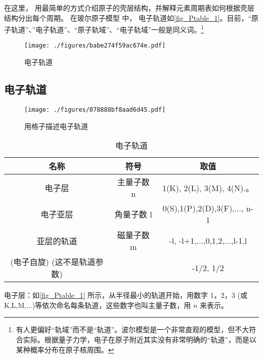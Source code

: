 
\begin{issues}
\issueTODO
\end{issues}

在这里， 用最简单的方式介绍原子的壳层结构，并解释元素周期表如何根据壳层结构分出每个周期。 在玻尔原子模型 中， 电子轨道如\autoref{fig_Ptable_1}。目前，“原子轨道”、”电子轨道”、“原子轨域”、“电子轨域”一般是同义词。\footnote{有人更偏好“轨域”而不是“轨道”。波尔模型是一个非常直观的模型，但不大符合实际。根据量子力学，电子在原子附近其实没有非常明确的“轨道”，而是以某种概率分布在原子核周围。}

\begin{figure}[ht]
\centering
\texttt{[image: ./figures/babe274f59ac674e.pdf]}
\caption{电子轨道}\label{fig_Ptable_1}
\end{figure}

\subsection{电子轨道}
\begin{figure}[ht]
\centering
\texttt{[image: ./figures/078888bf8aad6d45.pdf]}
\caption{用格子描述电子轨道}\label{fig_Ptable_4}
\end{figure}

\begin{table}[ht]
\centering
\caption{电子轨道}\label{tab_Ptable_1}
\begin{tabular}{|c|c|c|}
\hline
名称&符号&取值\\
\hline
电子层&主量子数 n& 1(K), 2(L), 3(M), 4(N).。 \\
\hline
电子亚层&角量子数 l& 0(S),1(P),2(D),3(F),..., n-1 \\
\hline
亚层的轨道&磁量子数 m & -l, -l+1,...,0,1,2,...,l-1,l \\
\hline
(电子自旋) (这不是轨道参数)&&-1/2, 1/2\\
\hline
\end{tabular}
\end{table}

电子层：如\autoref{fig_Ptable_1} 所示，从半径最小的轨道开始，用数字 1，2，3 (或K,L,M,...)等依次命名每条轨道，这些数字也叫主量子数，用 $n$ 来表示。 

